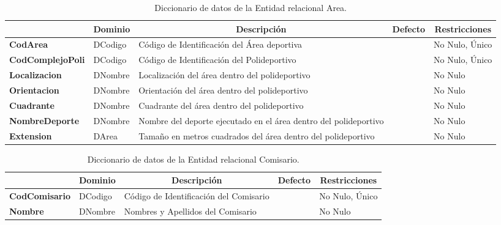 \begin{table}[H]
\centering
\caption{Diccionario de datos de la Entidad relacional Area.}
\label{tab-DiccR-1b}
\begin{tabular}{>{\bfseries}m{4.0cm}>{}m{3.0cm}>{}m{6.0cm}>{}m{5.0cm}>{}m{2.0cm}}
\toprule
\multicolumn{1}{c}{\textbf{Atributo}} & \multicolumn{1}{c}{\textbf{Dominio}} & \multicolumn{1}{c}{\textbf{Descripción}} & \multicolumn{1}{c}{\textbf{Defecto}} & \multicolumn{1}{c}{\textbf{Restricciones}} \\ \midrule
CodArea    & DCodigo   & Código de Identificación  del Área deportiva &   & No Nulo, Único\\
CodComplejoPoli    & DCodigo   & Código de Identificación  del Polideportivo &   & No Nulo, Único\\
Localizacion    & DNombre   & Localización del área dentro del polideportivo &   & No Nulo\\
Orientacion    & DNombre   & Orientación  del área dentro del polideportivo &   & No Nulo\\
Cuadrante    & DNombre   & Cuadrante del área dentro del polideportivo &   & No Nulo\\
NombreDeporte    & DNombre   & Nombre del deporte ejecutado en el área dentro del polideportivo &   & No Nulo\\
Extension & DArea   & Tamaño en metros cuadrados del área dentro del polideportivo  &   & No Nulo\\ \bottomrule
\end{tabular}
\end{table}

\begin{table}[H]
\centering
\caption{Diccionario de datos de la Entidad relacional Comisario.}
\label{tab-DiccR-1c}
\begin{tabular}{>{\bfseries}m{4.0cm}>{}m{3.0cm}>{}m{6.0cm}>{}m{5.0cm}>{}m{2.0cm}}
\toprule
\multicolumn{1}{c}{\textbf{Atributo}} & \multicolumn{1}{c}{\textbf{Dominio}} & \multicolumn{1}{c}{\textbf{Descripción}} & \multicolumn{1}{c}{\textbf{Defecto}} & \multicolumn{1}{c}{\textbf{Restricciones}} \\ \midrule
CodComisario	&   DCodigo	&   Código de Identificación  del Comisario	&	&   No Nulo, Único  \\
Nombre	&   DNombre	&   Nombres y Apellidos del Comisario	&	&   No Nulo \\\bottomrule
\end{tabular}
\end{table}

